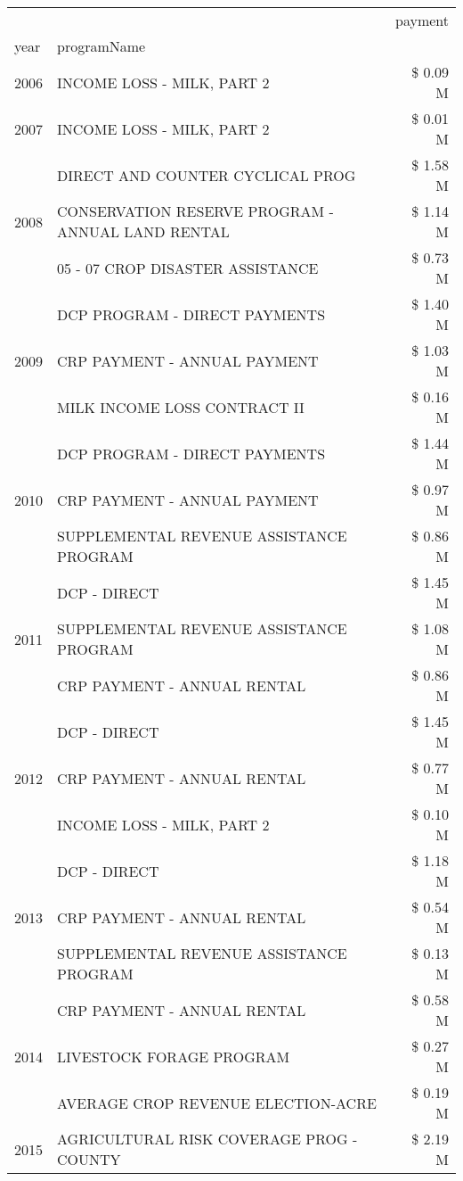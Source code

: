 \begin{tabular}{llr}
\toprule
 &  & payment \\
year & programName &  \\
\midrule
2006 & INCOME LOSS - MILK, PART 2 & \$ 0.09 M \\
\cline{1-3}
2007 & INCOME LOSS - MILK, PART 2 & \$ 0.01 M \\
\cline{1-3}
\multirow[t]{3}{*}{2008} & DIRECT AND COUNTER CYCLICAL PROG & \$ 1.58 M \\
 & CONSERVATION RESERVE PROGRAM - ANNUAL LAND RENTAL & \$ 1.14 M \\
 & 05 - 07 CROP DISASTER ASSISTANCE & \$ 0.73 M \\
\cline{1-3}
\multirow[t]{3}{*}{2009} & DCP PROGRAM - DIRECT PAYMENTS & \$ 1.40 M \\
 & CRP PAYMENT - ANNUAL PAYMENT & \$ 1.03 M \\
 & MILK INCOME LOSS CONTRACT II & \$ 0.16 M \\
\cline{1-3}
\multirow[t]{3}{*}{2010} & DCP PROGRAM - DIRECT PAYMENTS & \$ 1.44 M \\
 & CRP PAYMENT - ANNUAL PAYMENT & \$ 0.97 M \\
 & SUPPLEMENTAL REVENUE ASSISTANCE PROGRAM & \$ 0.86 M \\
\cline{1-3}
\multirow[t]{3}{*}{2011} & DCP - DIRECT & \$ 1.45 M \\
 & SUPPLEMENTAL REVENUE ASSISTANCE PROGRAM & \$ 1.08 M \\
 & CRP PAYMENT - ANNUAL RENTAL & \$ 0.86 M \\
\cline{1-3}
\multirow[t]{3}{*}{2012} & DCP - DIRECT & \$ 1.45 M \\
 & CRP PAYMENT - ANNUAL RENTAL & \$ 0.77 M \\
 & INCOME LOSS - MILK, PART 2 & \$ 0.10 M \\
\cline{1-3}
\multirow[t]{3}{*}{2013} & DCP - DIRECT & \$ 1.18 M \\
 & CRP PAYMENT - ANNUAL RENTAL & \$ 0.54 M \\
 & SUPPLEMENTAL REVENUE ASSISTANCE PROGRAM & \$ 0.13 M \\
\cline{1-3}
\multirow[t]{3}{*}{2014} & CRP PAYMENT - ANNUAL RENTAL & \$ 0.58 M \\
 & LIVESTOCK FORAGE PROGRAM & \$ 0.27 M \\
 & AVERAGE CROP REVENUE ELECTION-ACRE & \$ 0.19 M \\
\cline{1-3}
\multirow[t]{3}{*}{2015} & AGRICULTURAL RISK COVERAGE PROG - COUNTY & \$ 2.19 M \\

\end{tabular}
